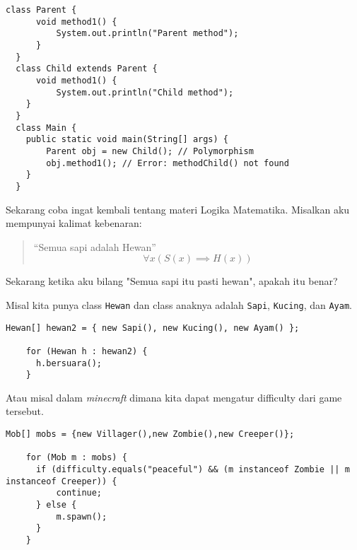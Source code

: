 \documentclass{../praktikum-ppt}
\begin{document}
    \begin{frame}[fragile]{\insertsection}
        \begin{lstlisting}[caption={Contoh polymorphism}]
  class Parent {
      void method1() {
          System.out.println("Parent method");
      }
  }
  class Child extends Parent {
      void method1() {
          System.out.println("Child method");
    }
  }
  class Main {
    public static void main(String[] args) {
        Parent obj = new Child(); // Polymorphism
        obj.method1(); // Error: methodChild() not found
    }
  }
        \end{lstlisting}
      
    \end{frame}


    \begin{frame}{\insertsection}
      Sekarang coba ingat kembali tentang materi Logika Matematika. Misalkan aku mempunyai kalimat kebenaran:
      \begin{quote}
        \centering\color{red}
        ``Semua sapi adalah Hewan''
        \[\forall x (S(x) \implies H(x))\]
      \end{quote}
      Sekarang ketika aku bilang "Semua sapi itu pasti hewan", apakah itu benar? 
    \end{frame}

    \begin{frame}[fragile]{\insertsection}
      \begin{contoh}
        Misal kita punya class \texttt{Hewan} dan class anaknya adalah \texttt{Sapi}, \texttt{Kucing}, dan \texttt{Ayam}. 
      \end{contoh}
      \begin{lstlisting}[caption={Aplikasi polymorphism}]
    Hewan[] hewan2 = { new Sapi(), new Kucing(), new Ayam() };
        
    for (Hewan h : hewan2) {
      h.bersuara();
    }
        \end{lstlisting}
    \end{frame}

    \begin{frame}[fragile]{\insertsection}
      \begin{contoh}
        Atau misal dalam \textit{minecraft} dimana kita dapat mengatur difficulty dari game tersebut.
      \end{contoh}
      \begin{lstlisting}[caption={Aplikasi dalam game}]
    Mob[] mobs = {new Villager(),new Zombie(),new Creeper()};
    
    for (Mob m : mobs) {
      if (difficulty.equals("peaceful") && (m instanceof Zombie || m instanceof Creeper)) {
          continue;
      } else {
          m.spawn();  
      }
    }
      \end{lstlisting}
    \end{frame}
    
\end{document}
